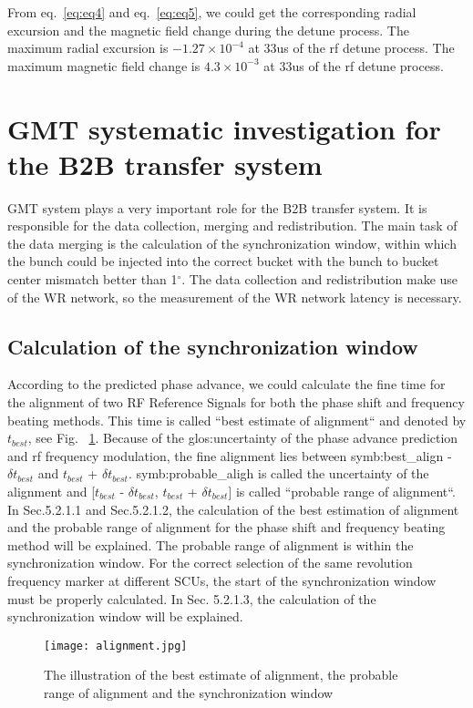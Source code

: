 
From eq.~\ref{eq:eq4} and eq.~\ref{eq:eq5}, we could get the corresponding radial excursion and the magnetic field change during the detune process. The maximum radial excursion is $-1.27 \times 10^{-4}$ at 33us of the rf detune process. The maximum magnetic field change is $4.3 \times 10^{-3}$ at 33us of the rf detune process.
 
\section{GMT systematic investigation for the B2B transfer system}
GMT system plays a very important role for the B2B transfer system. It is responsible for the data collection, merging and redistribution. The main task of the data merging is the calculation of the synchronization window, within which the bunch could be injected into the correct bucket with the bunch to bucket center mismatch better than 1$^\circ$. The data collection and redistribution make use of the WR network, so the measurement of the WR network latency is necessary. 

\subsection{Calculation of the synchronization window}
According to the predicted phase advance, we could calculate the fine time for the alignment of two RF Reference Signals for both the phase shift and frequency beating methods. This time is called ``best estimate of alignment`` and denoted by $t_{best}$, see Fig. ~\ref{alignment}. Because of the \gls{glos:uncertainty} of the phase advance prediction and rf frequency modulation, the fine alignment lies between \gls{symb:best_align} - $\delta t_{best}$ and $t_{best}$ + $\delta t_{best}$. \gls{symb:probable_aligh} is called the uncertainty of the alignment and [$t_{best}$ - $\delta t_{best}$, $t_{best}$ + $\delta t_{best}$] is called ``probable range of alignment``. In Sec.5.2.1.1 and Sec.5.2.1.2, the calculation of the best estimation of alignment and the probable range of alignment for the phase shift and frequency beating method will be explained. The probable range of alignment is within the synchronization window. For the correct selection of the same revolution frequency marker at different SCUs, the start of the synchronization  window must be properly calculated. In Sec. 5.2.1.3, the calculation of the synchronization window will be explained. 
\begin{figure}[!htb]
   \centering   
   \texttt{[image: alignment.jpg]}
   \caption{The illustration of the best estimate of alignment, the probable range of alignment and the synchronization window}
   \label{alignment}
\end{figure}

